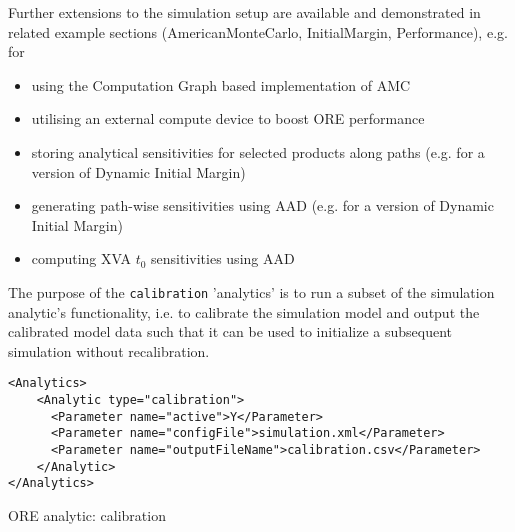 {Further extensions to the simulation setup are available and demonstrated in related example sections (AmericanMonteCarlo,
InitialMargin, Performance), e.g. for
\begin{itemize}
\item using the Computation Graph based implementation of AMC
\item utilising an external compute device to boost ORE performance
\item storing analytical sensitivities for selected products along paths (e.g. for a version of Dynamic Initial Margin)
\item generating path-wise sensitivities using AAD  (e.g. for a version of Dynamic Initial Margin)
\item computing XVA $t_0$ sensitivities using AAD
\end{itemize}

%
%
%
%
%


\medskip The purpose of the {\tt calibration} 'analytics' is to run a subset of the simulation analytic's functionality,
i.e. to calibrate the simulation model and output the calibrated model data such that it can be used to initialize
a subsequent simulation without recalibration.

\begin{listing}[H]
\begin{verbatim}
<Analytics>
    <Analytic type="calibration">
      <Parameter name="active">Y</Parameter>
      <Parameter name="configFile">simulation.xml</Parameter>
      <Parameter name="outputFileName">calibration.csv</Parameter>
    </Analytic>
</Analytics>
\end{verbatim}
\caption{ORE analytic: calibration}
\label{lst:ore_calibration}
\end{listing}

}
